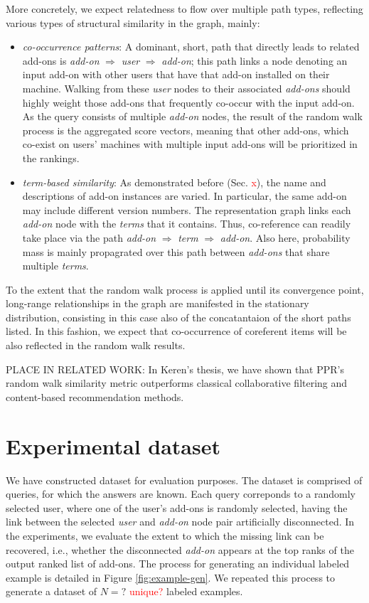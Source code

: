 \documentclass[11pt,oneside]{book}
\let\Oldsection\section
\renewcommand{\section}{\FloatBarrier\Oldsection}
\begin{document}
More concretely, we expect relatedness to flow over multiple path
types, reflecting various types of structural similarity in the graph,
mainly:
\begin{itemize}
\item {\it co-occurrence patterns}: A dominant, short, path that
  directly leads to related add-ons is {\it add-on} $\Rightarrow$ {\it user}
   $\Rightarrow$ {\it add-on}; this path links a node denoting an input add-on
  with other users that have that add-on installed on their
  machine. Walking from these {\it user} nodes to their associated
  {\it add-ons} should highly weight those add-ons that frequently
  co-occur with the input add-on. As the query consists of multiple
  {\it add-on} nodes, the result of the random walk process is the
  aggregated score vectors, meaning that other add-ons, which co-exist
  on users' machines with multiple input add-ons will be prioritized
  in the rankings. 
\item {\it term-based similarity}: As demonstrated before
  (Sec. \textcolor{red}{x}), the name and descriptions of add-on
  instances are varied. In particular, the same add-on may include
  different version numbers. The representation graph links each {\it
    add-on} node with the {\it terms} that it contains. Thus,
  co-reference can readily take place via the path {\it add-on}
  $\Rightarrow$ {\it term} $\Rightarrow$ {\it add-on}. Also here,
  probability mass is mainly propagrated over this path between {\it
    add-ons} that share multiple {\it terms}.
\end{itemize}

To the extent that the random walk process is applied until its
convergence point, long-range relationships in the graph are
manifested in the stationary distribution, consisting in this case
also of the concatantaion of the short paths listed. In this fashion,
we expect that co-occurrence of coreferent items will be also
reflected in the random walk results.

PLACE IN RELATED WORK: In Keren's thesis, we have shown that PPR's
random walk similarity metric outperforms classical collaborative
filtering and content-based recommendation methods.


\section{Experimental dataset}

We have constructed dataset for evaluation purposes. The dataset is
comprised of queries, for which the answers are known. Each query
correponds to a randomly selected user, where one of the user's
add-ons is randomly selected, having the link between the selected
{\it user} and {\it add-on} node pair artificially disconnected. In
the experiments, we evaluate the extent to which the missing link can
be recovered, i.e., whether the disconnected {\it add-on} appears at
the top ranks of the output ranked list of add-ons. The process for
generating an individual labeled example is detailed in Figure
\ref{fig:example-gen}. We repeated this process to generate a dataset
of $N=?$ \textcolor{red}{unique?} labeled examples.
\end{document}
